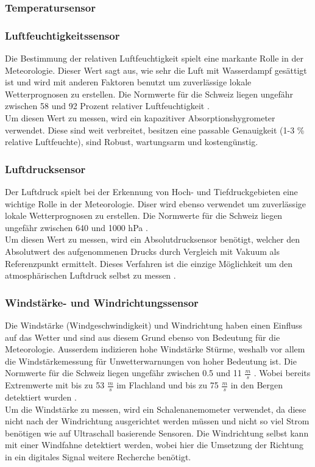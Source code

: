\subsubsection{Temperatursensor}

\subsubsection{Luftfeuchtigkeitssensor}
Die Bestimmung der relativen Luftfeuchtigkeit spielt eine markante Rolle in der Meteorologie. Dieser Wert sagt aus, wie sehr die Luft mit Wasserdampf gesättigt ist und wird mit anderen Faktoren benutzt um zuverlässige lokale Wetterprognosen zu erstellen. Die Normwerte für die Schweiz liegen ungefähr zwischen 58 und 92 Prozent relativer Luftfeuchtigkeit  \cite{MeteoSchweizFeuchte}.\\
Um diesen Wert zu messen, wird ein kapazitiver Absorptionshygrometer verwendet. Diese sind weit verbreitet, besitzen eine passable Genauigkeit (1-3 \% relative Luftfeuchte), sind Robust, wartungsarm und kostengünstig.

\subsubsection{Luftdrucksensor}
Der Luftdruck spielt bei der Erkennung von Hoch- und Tiefdruckgebieten eine wichtige Rolle in der Meteorologie. Diser wird ebenso verwendet um zuverlässige lokale Wetterprognosen zu erstellen. Die Normwerte für die Schweiz liegen ungefähr zwischen 640 und 1000 hPa \cite{MeteoSchweizDruck}.\\
Um diesen Wert zu messen, wird ein Absolutdrucksensor benötigt, welcher den Absolutwert des aufgenommenen Drucks durch Vergleich mit Vakuum als Referenzpunkt ermittelt. Dieses Verfahren ist die einzige Möglichkeit um den atmosphärischen Luftdruck selbst zu messen \cite{WikiDruck}. 

\subsubsection{Windstärke- und Windrichtungssensor}
Die Windstärke (Windgeschwindigkeit) und Windrichtung haben einen Einfluss auf das Wetter und sind aus diesem Grund ebenso von Bedeutung für die Meteorologie. Ausserdem indizieren hohe Windstärke Stürme, weshalb vor allem die Windstärkemessung für Unwetterwarnungen von hoher Bedeutung ist. Die Normwerte für die Schweiz liegen ungefähr zwischen 0.5 und 11 $\frac{m}{s}$ \cite{MeteoSchweizWindnorm}. Wobei bereits Extremwerte mit bis zu 53 $\frac{m}{s}$ im Flachland und bis zu 75 $\frac{m}{s}$ in den Bergen detektiert wurden \cite{MeteoSchweizExtrem}.\\
Um die Windstärke zu messen, wird ein Schalenanemometer verwendet, da diese nicht nach der Windrichtung ausgerichtet werden müssen und nicht so viel Strom benötigen wie auf Ultraschall basierende Sensoren. Die Windrichtung selbst kann mit einer Windfahne detektiert werden, wobei hier die Umsetzung der Richtung in ein digitales Signal weitere Recherche benötigt.


